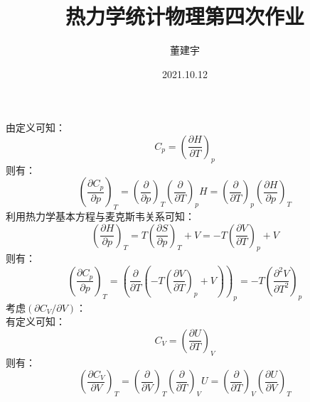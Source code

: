 \documentclass[a4paper,12pt]{article}
\title{热力学统计物理第四次作业}
\date{2021.10.12}
\author{董建宇}
\begin{document}
\maketitle

\titleformat{\section}[hang]{\small}{\thesection}{0.8em}{}{}
\titleformat{\subsection}[hang]{\small}{\thesubsection}{0.8em}{}{}

\section{}
由定义可知：
\begin{equation}\nonumber
	C_p=\left(\frac{\partial H}{\partial T}\right)_p
\end{equation}
则有：
\begin{equation}\nonumber
	\left(\frac{\partial C_p}{\partial p}\right)_T=\left(\frac{\partial }{\partial p}\right)_T \left(\frac{\partial }{\partial T}\right)_p H=\left(\frac{\partial }{\partial T}\right)_p \left(\frac{\partial H}{\partial p}\right)_T
\end{equation}
利用热力学基本方程与麦克斯韦关系可知：
\begin{equation}\nonumber
	\left(\frac{\partial H}{\partial p}\right)_T = T\left(\frac{\partial S}{\partial p}\right)_T + V = -T\left(\frac{\partial V}{\partial T}\right)_p + V
\end{equation}
则有：
\begin{equation}\nonumber
	\left(\frac{\partial C_p}{\partial p}\right)_T = \left(\frac{\partial }{\partial T}\left(-T\left(\frac{\partial V}{\partial T}\right)_p + V\right)\right)_p = -T\left(\frac{\partial^2V}{\partial T^2}\right)_p
\end{equation}
考虑$\left(\partial C_V/\partial V\right)$：\\
有定义可知：
\begin{equation}\nonumber
	C_V = \left(\frac{\partial U}{\partial T}\right)_V
\end{equation}
则有：
\begin{equation}\nonumber
	\left(\frac{\partial C_V}{\partial V}\right)_T = \left(\frac{\partial }{\partial V}\right)_T \left(\frac{\partial }{\partial T}\right)_V U = \left(\frac{\partial }{\partial T}\right)_V \left(\frac{\partial U}{\partial V}\right)_T
\end{equation}
\end{document}
